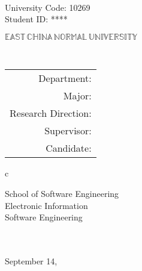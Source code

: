 \newpage

\pagestyle{empty}

\\
\hspace*{\fill} {\large University Code: 10269}\\
\hspace*{\fill} {\large Student ID: \ifnotanonymous {\stuID} \else *****\fi}

\vskip 2cm

\begin{center}
    {\Huge $\mathbb{EAST}\,\mathbb{CHINA}\,\mathbb{NORMAL}\,
            \mathbb{UNIVERSITY}$}
\end{center}

\vskip 3cm

\begin{center}
    \bfseries{\scshape{\huge {\thesisETitle}}} \\
\end{center}

\vskip 2cm

{\large
\begin{center}
\begin{tabular}{r}
    Department:         \\
    Major:              \\
    Research Direction: \\
    Supervisor:         \\
    Candidate:
\end{tabular}
\begin{tabular}c

    School of Software Engineering \\
    \hline Electronic Information \\
    \hline Software Engineering  \\
    \hline   \\
    \hline  \\


    \hline
\end{tabular}
\end{center}
}


\vskip 2.5cm  

\begin{center}
    {\Large September 14, \year}
\end{center}
